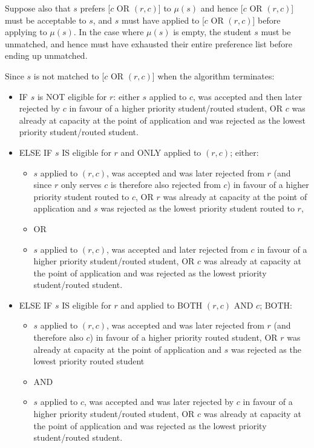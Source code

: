 \documentclass{article}
\begin{document}
Suppose also that $s$ prefers [$c$ OR $(r,c)$] to $\mu(s)$ and hence [$c$ OR $(r,c)$] must be acceptable to $s$, and $s$ must have applied to [$c$ OR $(r,c)$] before applying to $\mu(s)$. In the case where $\mu(s)$ is empty, the student $s$ must be unmatched, and hence must have exhausted their entire preference list before ending up unmatched.

Since $s$ is not matched to [$c$ OR $(r,c)$] when the algorithm terminates:
\begin{itemize}
    \item IF $s$ is NOT eligible for $r$: either $s$ applied to $c$, was accepted and then later rejected by $c$ in favour of a higher priority student/routed student, OR $c$ was already at capacity at the point of application and was rejected as the lowest priority student/routed student.
    \item ELSE IF $s$ IS eligible for $r$ and ONLY applied to $(r,c)$; either:
    \begin{itemize}
        \item $s$ applied to $(r,c)$, was accepted and was later rejected from $r$ (and since $r$ only serves $c$ is therefore also rejected from $c$) in favour of a higher priority student routed to $c$, OR $r$ was already at capacity at the point of application and $s$ was rejected as the lowest priority student routed to $r$,
        \item OR
        \item $s$ applied to $(r,c)$, was accepted and later rejected from $c$ in favour of a higher priority student/routed student, OR $c$ was already at capacity at the point of application and was rejected as the lowest priority student/routed student.
    \end{itemize}
    \item ELSE IF $s$ IS eligible for $r$ and applied to BOTH $(r,c)$ AND $c$; BOTH:
    \begin{itemize}
        \item $s$ applied to $(r,c)$, was accepted and was later rejected from $r$ (and therefore also $c$) in favour of a higher priority routed student, OR $r$ was already at capacity at the point of application and $s$ was rejected as the lowest priority routed student
        \item AND
        \item $s$ applied to $c$, was accepted and was later rejected by $c$ in favour of a higher priority student/routed student, OR $c$ was already at capacity at the point of application and was rejected as the lowest priority student/routed student.
    \end{itemize}
\end{itemize}
\end{document}
